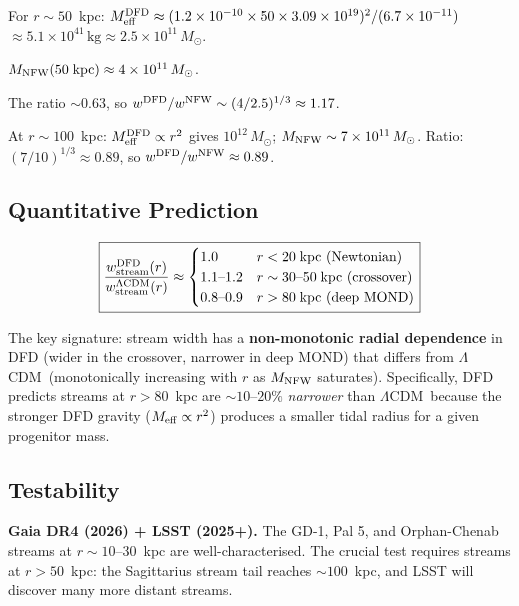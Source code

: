 \documentclass[11pt]{article}
\newcommand{\LCDM}{$\Lambda$CDM}
\begin{document}
For $r \sim 50$~kpc:
$M_{\rm eff}^{\rm DFD} \approx (1.2 \times 10^{-10} \times 50 \times 3.09 \times 10^{19})^2 / (6.7 \times 10^{-11})$
$\approx 5.1 \times 10^{41}\,\text{kg} \approx 2.5 \times 10^{11}\,M_\odot$.

$M_{\rm NFW}(50\;\text{kpc}) \approx 4 \times 10^{11}\,M_\odot$.

The ratio $\sim 0.63$, so $w^{\rm DFD}/w^{\rm NFW} \sim (4/2.5)^{1/3}
\approx 1.17$.

At $r \sim 100$~kpc: $M_{\rm eff}^{\rm DFD} \propto r^2$ gives
$10^{12}\,M_\odot$; $M_{\rm NFW} \sim 7 \times 10^{11}\,M_\odot$.
Ratio: $(7/10)^{1/3} \approx 0.89$, so $w^{\rm DFD}/w^{\rm NFW}
\approx 0.89$.

\subsection{Quantitative Prediction}

\begin{equation}
\boxed{
\frac{w_{\rm stream}^{\rm DFD}(r)}{w_{\rm stream}^{\rm \Lambda CDM}(r)}
\approx \begin{cases}
1.0 & r < 20\;\text{kpc (Newtonian)} \\
1.1\text{--}1.2 & r \sim 30\text{--}50\;\text{kpc (crossover)} \\
0.8\text{--}0.9 & r > 80\;\text{kpc (deep MOND)}
\end{cases}
}
\end{equation}

The key signature: stream width has a \textbf{non-monotonic radial
dependence} in DFD (wider in the crossover, narrower in deep MOND)
that differs from \LCDM\ (monotonically increasing with $r$ as
$M_{\rm NFW}$ saturates).  Specifically, DFD predicts streams at
$r > 80$~kpc are $\sim 10$--$20\%$ \emph{narrower} than \LCDM\ because
the stronger DFD gravity ($M_{\rm eff} \propto r^2$) produces a smaller
tidal radius for a given progenitor mass.

\subsection{Testability}

\textbf{Gaia DR4 (2026) + LSST (2025+).}
The GD-1, Pal 5, and Orphan-Chenab streams at $r \sim 10$--$30$~kpc
are well-characterised.  The crucial test requires streams at
$r > 50$~kpc: the Sagittarius stream tail reaches $\sim 100$~kpc,
and LSST will discover many more distant streams.
\end{document}
